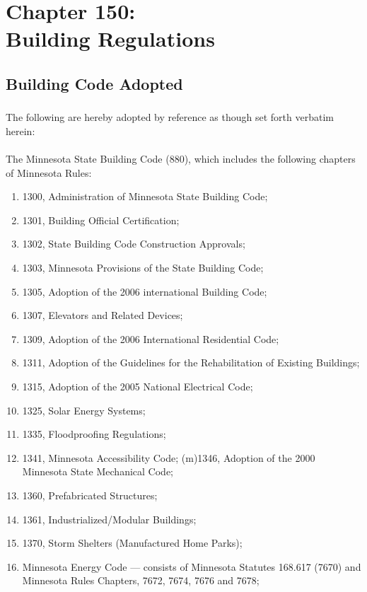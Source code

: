 \chapter*{Chapter 150: \\
	Building Regulations}
    \minitoc
    \pagebreak

\section{Building Code Adopted}
\subsection{}
The following are hereby adopted by reference as though set forth verbatim herein:
\subsubsection{}
The Minnesota State Building Code (880), which includes the following chapters of Minnesota Rules:
\begin{enumerate}
    \item 1300, Administration of Minnesota State Building Code;
    \item 1301, Building Official Certification;
    \item 1302, State Building Code Construction Approvals;
    \item 1303, Minnesota Provisions of the State Building Code;
    \item 1305, Adoption of the 2006 international Building Code;
    \item 1307, Elevators and Related Devices;
    \item 1309, Adoption of the 2006 International Residential Code;
    \item 1311, Adoption of the Guidelines for the Rehabilitation of Existing Buildings;
    \item 1315, Adoption of the 2005 National Electrical Code;
    \item 1325, Solar Energy Systems;
    \item 1335, Floodproofing Regulations;
    \item 1341, Minnesota Accessibility Code; (m)1346, Adoption of the 2000 Minnesota State Mechanical Code;
    \item 1360, Prefabricated Structures;
    \item 1361, Industrialized/Modular Buildings;
    \item 1370, Storm Shelters (Manufactured Home Parks);
    \item Minnesota Energy Code — consists of Minnesota Statutes 168.617 (7670) and Minnesota Rules Chapters, 7672, 7674, 7676 and 7678;
\end{enumerate}
